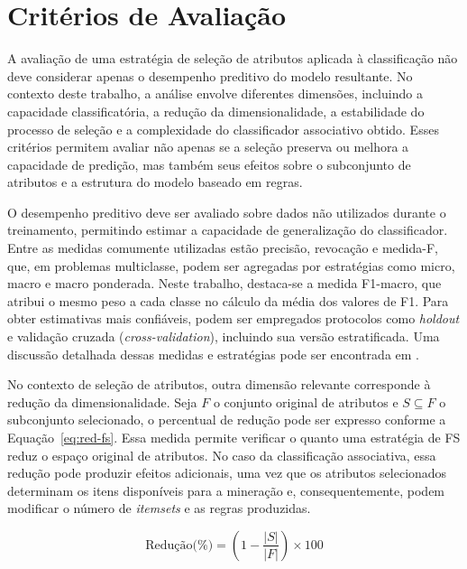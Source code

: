 \section{Critérios de Avaliação}
\label{met_avaliacao}

A avaliação de uma estratégia de seleção de atributos aplicada à classificação não deve considerar apenas o desempenho preditivo do modelo resultante. No contexto deste trabalho, a análise envolve diferentes dimensões, incluindo a capacidade classificatória, a redução da dimensionalidade, a estabilidade do processo de seleção e a complexidade do classificador associativo obtido. Esses critérios permitem avaliar não apenas se a seleção preserva ou melhora a capacidade de predição, mas também seus efeitos sobre o subconjunto de atributos e a estrutura do modelo baseado em regras.

O desempenho preditivo deve ser avaliado sobre dados não utilizados durante o treinamento, permitindo estimar a capacidade de generalização do classificador. Entre as medidas comumente utilizadas estão precisão, revocação e medida-F, que, em problemas multiclasse, podem ser agregadas por estratégias como micro, macro e macro ponderada. Neste trabalho, destaca-se a medida F1-macro, que atribui o mesmo peso a cada classe no cálculo da média dos valores de F1. Para obter estimativas mais confiáveis, podem ser empregados protocolos como \textit{holdout} e validação cruzada (\textit{cross-validation}), incluindo sua versão estratificada. Uma discussão detalhada dessas medidas e estratégias pode ser encontrada em .

No contexto de seleção de atributos, outra dimensão relevante corresponde à redução da dimensionalidade. Seja $F$ o conjunto original de atributos e $S \subseteq F$ o subconjunto selecionado, o percentual de redução pode ser expresso conforme a Equação~\ref{eq:red-fs}. Essa medida permite verificar o quanto uma estratégia de FS reduz o espaço original de atributos. No caso da classificação associativa, essa redução pode produzir efeitos adicionais, uma vez que os atributos selecionados determinam os itens disponíveis para a mineração e, consequentemente, podem modificar o número de \textit{itemsets} e as regras produzidas.

\begin{equation}\label{eq:red-fs}
    \text{Redu\c{c}\~{a}o(\%)} =
    \left(
    1 - \frac{|S|}{|F|}
    \right) \times 100
\end{equation}

